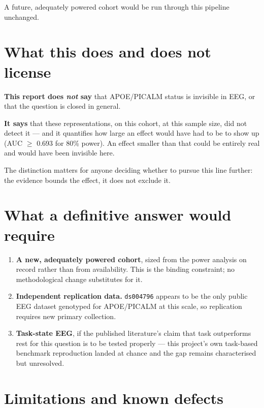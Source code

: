 \documentclass[11pt]{article}
\begin{document}
A future, adequately powered cohort would be run through this pipeline unchanged.

\section{What this does and does not license}

\textbf{This report does \emph{not} say} that APOE/PICALM status is invisible in
EEG, or that the question is closed in general.

\textbf{It says} that these representations, on this cohort, at this sample size,
did not detect it --- and it quantifies how large an effect would have had to be
to show up (AUC $\geq$ 0.693 for 80\% power). An effect smaller than that could
be entirely real and would have been invisible here.

The distinction matters for anyone deciding whether to pursue this line further:
the evidence bounds the effect, it does not exclude it.

\section{What a definitive answer would require}

\begin{enumerate}[leftmargin=1.2cm]
  \item \textbf{A new, adequately powered cohort}, sized from the power analysis
        on record rather than from availability. This is the binding constraint;
        no methodological change substitutes for it.
  \item \textbf{Independent replication data.} \texttt{ds004796} appears to be
        the only public EEG dataset genotyped for APOE/PICALM at this scale, so
        replication requires new primary collection.
  \item \textbf{Task-state EEG}, if the published literature's claim that task
        outperforms rest for this question is to be tested properly --- this
        project's own task-based benchmark reproduction landed at chance and the
        gap remains characterised but unresolved.
\end{enumerate}

\section{Limitations and known defects}
\end{document}
